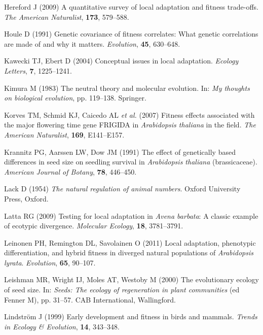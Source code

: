 \documentclass[]{article}
\begin{document}
\leavevmode\hypertarget{ref-Hereford2009}{}%
Hereford J (2009) A quantitative survey of local adaptation and fitness trade-offs. \emph{The American Naturalist}, \textbf{173}, 579--588.

\leavevmode\hypertarget{ref-Houle1991}{}%
Houle D (1991) Genetic covariance of fitness correlates: What genetic correlations are made of and why it matters. \emph{Evolution}, \textbf{45}, 630--648.

\leavevmode\hypertarget{ref-Kawecki2004}{}%
Kawecki TJ, Ebert D (2004) Conceptual issues in local adaptation. \emph{Ecology Letters}, \textbf{7}, 1225--1241.

\leavevmode\hypertarget{ref-kimura2020neutral}{}%
Kimura M (1983) The neutral theory and molecular evolution. In: \emph{My thoughts on biological evolution}, pp. 119--138. Springer.

\leavevmode\hypertarget{ref-korves2007fitness}{}%
Korves TM, Schmid KJ, Caicedo AL \emph{et al.} (2007) Fitness effects associated with the major flowering time gene FRIGIDA in \emph{Arabidopsis thaliana} in the field. \emph{The American Naturalist}, \textbf{169}, E141--E157.

\leavevmode\hypertarget{ref-krannitz1991effect}{}%
Krannitz PG, Aarssen LW, Dow JM (1991) The effect of genetically based differences in seed size on seedling survival in \emph{Arabidopsis thaliana} (brassicaceae). \emph{American Journal of Botany}, \textbf{78}, 446--450.

\leavevmode\hypertarget{ref-Lack1954}{}%
Lack D (1954) \emph{The natural regulation of animal numbers}. Oxford University Press, Oxford.

\leavevmode\hypertarget{ref-Latta2009}{}%
Latta RG (2009) Testing for local adaptation in \emph{Avena barbata}: A classic example of ecotypic divergence. \emph{Molecular Ecology}, \textbf{18}, 3781--3791.

\leavevmode\hypertarget{ref-leinonen2011local}{}%
Leinonen PH, Remington DL, Savolainen O (2011) Local adaptation, phenotypic differentiation, and hybrid fitness in diverged natural populations of \emph{Arabidopsis lyrata}. \emph{Evolution}, \textbf{65}, 90--107.

\leavevmode\hypertarget{ref-Leishman2000}{}%
Leishman MR, Wright IJ, Moles AT, Westoby M (2000) The evolutionary ecology of seed size. In: \emph{Seeds: The ecology of regeneration in plant communities} (ed Fenner M), pp. 31--57. CAB International, Wallingford.

\leavevmode\hypertarget{ref-lindstrom1999early}{}%
Lindström J (1999) Early development and fitness in birds and mammals. \emph{Trends in Ecology \& Evolution}, \textbf{14}, 343--348.
\end{document}
